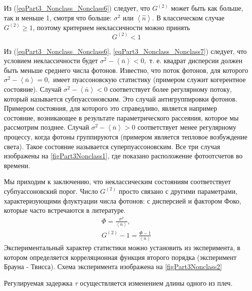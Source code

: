 Из (\ref{eqPart3_Nonclass_Nonclass6}) следует, что $G^{(2)}$ может
быть как больше, так и меньше 1, смотря что больше: $\sigma^2$ или
$\left<\hat{n}\right>$. В классическом случае $G^{(2)} \ge 1$, поэтому
критерием неклассичности можно принять 
\begin{equation}
G^{(2)} < 1
\label{eqPart3_Nonclass_Nonclass7}
\end{equation}

Из (\ref{eqPart3_Nonclass_Nonclass6},
\ref{eqPart3_Nonclass_Nonclass7}) следует, что условием неклассичности
будет 
\(
\sigma^2 - \left<\bar{n}\right> < 0,
\) 
т. е. квадрат дисперсии должен быть меньше среднего числа
фотонов. 
Известно, что поток фотонов, для которого
\(
\sigma^2 - \left<\bar{n}\right> = 0,
\)
имеет пуассоновскую статистику (примером служит когерентное
состояние). Случай 
\(
\sigma^2 - \left<\bar{n}\right> < 0
\)
соответствует более регулярному потоку, который называется
субпуассоновским. Это случай антигруппировки фотонов. Примером
состояния, для которого это справедливо, является например состояние,
возникающее в результате параметрического рассеяния, которое мы
рассмотрим позднее. Случай
\(
\sigma^2 - \left<\bar{n}\right> > 0
\)
соответствует менее регулярному процессу, когда фотоны группируются
(примером является тепловое возбуждение света). Такое состояние
называется суперпуассоновским. Все три случая изображены на
\autoref{figPart3Nonclass1}, где показано расположение фотоотсчетов
во времени.



Мы приходим к заключению, что неклассическим состояниям соответствует
субпуассоновский порог. Число $G^{(2)}$ просто связано с другими
параметрами, характеризующими флуктуации числа фотонов: с дисперсией и
фактором Фоко, которые часто встречаются в литературе.
\begin{eqnarray}
\Phi  = \frac{\sigma^2}{\left<\bar{n}\right>},
\nonumber \\
G^{(2)} - 1 = \frac{\Phi - 1}{\left<\bar{n}\right>}
\nonumber
\end{eqnarray}
Экспериментальный характер статистики можно установить из эксперимента,
в котором определяется корреляционная функция второго порядка
(эксперимент Брауна - Твисса). Схема эксперимента изображена на
\autoref{figPart3Nonclass2} 



Регулируемая задержка $\tau$ осуществляется изменением длины одного из
плеч.

